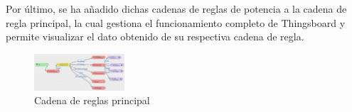 Por último, se ha añadido dichas cadenas de reglas de potencia a la cadena de regla principal, la cual gestiona el funcionamiento completo de Thingsboard y permite visualizar el dato obtenido de su respectiva cadena de regla.

\begin{figure}[H]
    \centering
    \includegraphics[width=0.3\textwidth]{images/3-software/3-2-2-thingsboard/CadenaPrincipal.png}
    \caption{Cadena de reglas principal}
    \label{fig:3-2-2-CadenaPrincipalThingsBoard}
\end{figure}